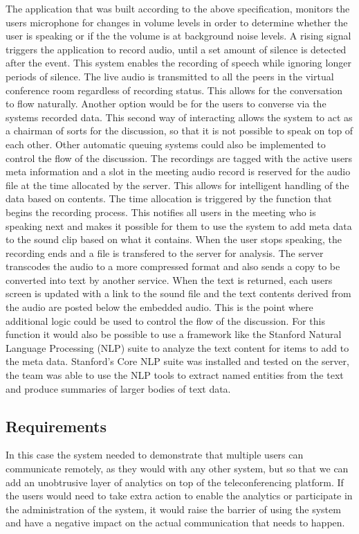 \documentclass[english,12pt,a4paper,dvips]{article}
\begin{document}
The application that was built according to the above specification, monitors the users microphone for changes in volume levels in order to determine whether the user is speaking or if the the volume is at background noise levels. A rising signal triggers the application to record audio, until a set amount of silence is detected after the event. This system enables the recording of speech while ignoring longer periods of silence. The live audio is transmitted to all the peers in the virtual conference room regardless of recording status. This allows for the conversation to flow naturally. Another option would be for the users to converse via the systems recorded data. This second way of interacting allows the system to act as a chairman of sorts for the discussion, so that it is not possible to speak on top of each other. Other automatic queuing systems could also be implemented to control the flow of the discussion. The recordings are tagged with the active users meta information and a slot in the meeting audio record is reserved for the audio file at the time allocated by the server. This allows for intelligent handling of the data based on contents. The time allocation is triggered by the function that begins the recording process. This notifies all users in the meeting who is speaking next and makes it possible for them to use the system to add meta data to the sound clip based on what it contains. When the user stops speaking, the recording ends and a file is transfered to the server for analysis. The server transcodes the audio to a more compressed format and also sends a copy to be converted into text by another service. When the text is returned, each users screen is updated with a link to the sound file and the text contents derived from the audio are posted below the embedded audio. This is the point where additional logic could be used to control the flow of the discussion. For this function it would also be possible to use a framework like the Stanford Natural Language Processing (NLP) suite to analyze the text content for items to add to the meta data. Stanford's Core NLP suite was installed and tested on the server, the team was able to use the NLP tools to extract named entities from the text and produce summaries of larger bodies of text data.

\subsection{Requirements}

In this case the system needed to demonstrate that multiple users can communicate remotely, as they would with any other system, but so that we can add an unobtrusive layer of analytics on top of the teleconferencing platform. If the users would need to take extra action to enable the analytics or participate in the administration of the system, it would raise the barrier of using the system and have a negative impact on the actual communication that needs to happen. 
\end{document}
